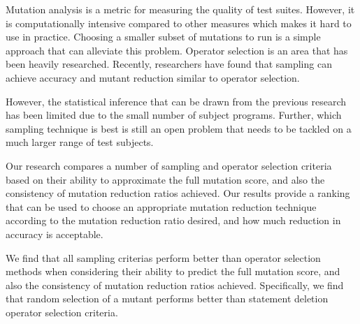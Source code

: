 Mutation analysis is a metric for measuring the quality of test
suites. However, it is computationally intensive compared to other measures
which makes it hard to use in practice. Choosing a smaller subset of mutations
to run is a simple approach that can alleviate this problem.
Operator selection is an area that has been heavily researched. Recently,
researchers have found that sampling can achieve accuracy and mutant
reduction similar to operator selection.

However, the statistical inference that can be drawn from the previous
research has been limited due to the small number of subject programs. Further,
which sampling technique is best is still an open problem that needs to be
tackled on a much larger range of test subjects.

Our research compares a number of sampling and operator selection criteria
based on their ability to approximate the full mutation score, and also
the consistency of mutation reduction ratios achieved. Our results provide
a ranking that can be used to choose an appropriate mutation reduction
technique according to the mutation reduction ratio desired, and how much
reduction in accuracy is acceptable.

We find that all sampling criterias perform better than operator selection
methods when considering their ability to predict the full mutation score,
and also the consistency of mutation reduction ratios achieved.  Specifically,
we find that random selection of a mutant performs better than statement
deletion operator selection criteria.

